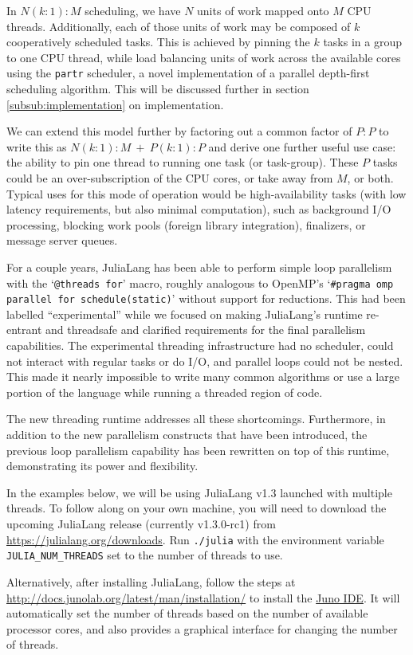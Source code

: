 \documentclass{juliacon}
\begin{document}
In $N (k \mathbin{:} 1) \mathbin{:} M$ scheduling, we have $N$ units of work mapped onto $M$ CPU threads. Additionally, each of those units of work may be composed of $k$ cooperatively scheduled tasks. This is achieved by pinning the $k$ tasks in a group to one CPU thread, while load balancing units of work across the available cores using the \verb|partr| scheduler, a novel implementation of a parallel depth-first scheduling algorithm. This will be discussed further in section \ref{subsub:implementation} on implementation.

We can extend this model further by factoring out a common factor of $P \mathbin{:} P$ to write this as $N (k \mathbin{:} 1) \mathbin{:} M\ +\ P(k \mathbin{:} 1) \mathbin{:} P$ and derive one further useful use case: the ability to pin one thread to running one task (or task-group). These $P$ tasks could be an over-subscription of the CPU cores, or take away from $M$, or both. Typical uses for this mode of operation would be high-availability tasks (with low latency requirements, but also minimal computation), such as background I/O processing, blocking work pools (foreign library integration), finalizers, or message server queues.

For a couple years, JuliaLang has been able to perform simple loop parallelism with the `\verb|@threads for|' macro, roughly analogous to OpenMP's `\verb|#pragma omp parallel for schedule(static)|' without support for reductions. This had been labelled ``experimental'' while we focused on making JuliaLang's runtime re-entrant and threadsafe and clarified requirements for the final parallelism capabilities. The experimental threading infrastructure had no scheduler, could not interact with regular tasks or do I/O, and parallel loops could not be nested. This made it nearly impossible to write many common algorithms or use a large portion of the language while running a threaded region of code.

The new threading runtime addresses all these shortcomings. Furthermore, in addition to the new parallelism constructs that have been introduced, the previous loop parallelism capability has been rewritten on top of this runtime, demonstrating its power and flexibility.

\begin{calloutbox}
In the examples below, we will be using JuliaLang v1.3 launched with multiple threads.
To follow along on your own machine, you will need to download the upcoming JuliaLang release (currently v1.3.0-rc1) from \url{https://julialang.org/downloads}.
Run \verb|./julia| with the environment variable \verb|JULIA_NUM_THREADS| set to the number of threads to use.

Alternatively, after installing JuliaLang, follow the steps at \url{http://docs.junolab.org/latest/man/installation/} to install the \href{https://junolab.org}{Juno IDE}. It will automatically set the number of threads based on the number of available processor cores, and also provides a graphical interface for changing the number of threads.
\end{calloutbox}
\end{document}
